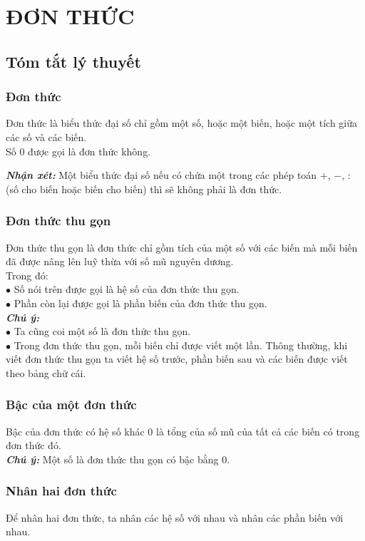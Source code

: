 \section{ĐƠN THỨC}
\subsection{Tóm tắt lý thuyết}
\subsubsection{Đơn thức}
\begin{dn}
Đơn thức là biểu thức đại số chỉ gồm một số, hoặc một biến, hoặc một tích giữa các số và các biến.\\
Số $0$ được gọi là đơn thức không.
\end{dn}
\textbf{\textit{Nhận xét:}} Một biểu thức đại số nếu có chứa một trong các phép toán $+$, $-$, $:$ (số cho biến hoặc biến cho biến) thì sẽ không phải là đơn thức.

\subsubsection{Đơn thức thu gọn}
Đơn thức thu gọn là đơn thức chỉ gồm tích của một số với các biến mà mỗi biến đã được nâng lên luỹ thừa với số mũ nguyên dương.\\
Trong đó:\\
	$\bullet$ Số nói trên được gọi là hệ số của đơn thức thu gọn.\\
	$\bullet$ Phần còn lại được gọi là phần biến của đơn thức thu gọn.\\
\textbf{\textit{Chú ý:}}\\
$\bullet$ Ta cũng coi một số là đơn thức thu gọn.\\
$\bullet$ Trong đơn thức thu gọn, mỗi biến chỉ được viết một lần. Thông thường, khi viết đơn thức thu gọn ta viết hệ số trước, phần biến sau và các biến được viết theo bảng chữ cái.
\subsubsection{Bậc của một đơn thức}	
Bậc của đơn thức có hệ số khác $0$ là tổng của số mũ của tất cả các biến có trong đơn thức đó.\\
\textbf{\textit{Chú ý:}} Một số là đơn thức thu gọn có bậc bằng $0$.
\subsubsection{Nhân hai đơn thức}
Để nhân hai đơn thức, ta nhân các hệ số với nhau và nhân các phần biến với nhau.

